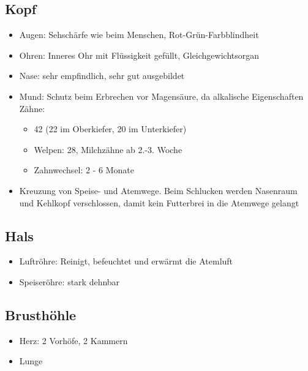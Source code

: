     \subsection{Kopf}
    \begin{itemize}
        \item Augen: Sehschärfe wie beim Menschen, Rot-Grün-Farbblindheit
        \item Ohren: Inneres Ohr mit Flüssigkeit gefüllt, Gleichgewichtsorgan
        \item Nase: sehr empfindlich, sehr gut ausgebildet
        \item Mund: Schutz beim Erbrechen vor Magensäure, da alkalische Eigenschaften \\
              Zähne:
        \begin{itemize}
            \item 42 (22 im Oberkiefer, 20 im Unterkiefer)
            \item Welpen: 28, Milchzähne ab 2.-3. Woche
            \item Zahnwechsel: 2 - 6 Monate
        \end{itemize}
        \item Kreuzung von Speise- und Atemwege. Beim Schlucken werden Nasenraum und Kehlkopf verschlossen, damit kein Futterbrei in die Atemwege gelangt
    \end{itemize}

    \subsection{Hals}
    \begin{itemize}
        \item Luftröhre: Reinigt, befeuchtet und erwärmt die Atemluft
        \item Speiseröhre: stark dehnbar
    \end{itemize}

    \subsection{Brusthöhle}
    \begin{itemize}
        \item Herz: 2 Vorhöfe, 2 Kammern
        \item Lunge
    \end{itemize}

